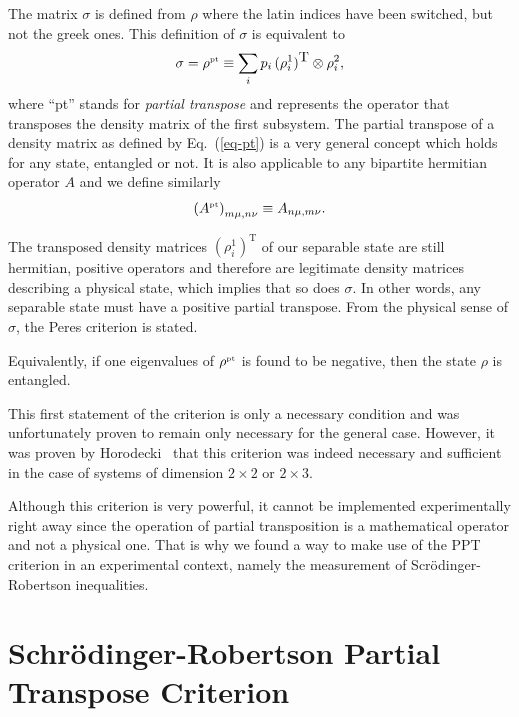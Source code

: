 The matrix $\sigma$ is defined from $\rho$ where the latin indices have been switched, but not the greek ones. This definition of $\sigma$ is equivalent to
\[ \sigma=\rho^{\mbox{\tiny \textup{pt}}}  \equiv  \sum_i p_i \, (\rho^1_i)^{\mbox{T}} \otimes \rho^2_i, \]
where ``pt'' stands for \textit{partial transpose} and represents the operator that transposes the density matrix of the first subsystem. The partial transpose of a density matrix as defined by Eq.~(\ref{eq-pt}) is a very general concept which holds for any state, entangled or not. It is also applicable to any bipartite hermitian operator $A$ and we define similarly
\[  \left(A^{\mbox{\tiny \textup{pt}}} \right)_{m\mu,n\nu} \equiv  A_{n\mu,m\nu}.\]

The transposed density matrices $(\rho^1_i)^{\mbox{T}}$ of our separable state are still hermitian, positive operators and therefore are legitimate density matrices describing a physical state, which implies that so does $\sigma$. In other words, any separable state must have a positive partial transpose. From the physical sense of $\sigma$, the Peres criterion is stated.


Equivalently, if one eigenvalues of $\rho^{\mbox{\tiny \textup{pt}}}$ is found to be negative, then the state $\rho$ is entangled.

This first statement of the criterion is only a necessary condition and was unfortunately proven to remain only necessary for the general case. However, it was proven by Horodecki~\cite{HHH96} that this criterion was indeed necessary and sufficient in the case of systems of dimension $2\times 2$ or $2\times 3$.


Although this criterion is very powerful, it cannot be implemented experimentally right away since the operation of partial transposition is a mathematical operator and not a physical one. That is why we found a way to make use of the PPT criterion in an experimental context, namely the measurement of Scr\"odinger-Robertson inequalities.

\section{Schr\"odinger-Robertson Partial Transpose Criterion} \label{sec-SRPT}

